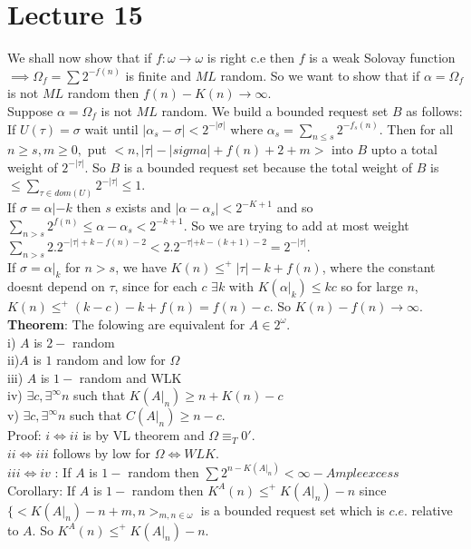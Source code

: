 \documentclass{article}
\begin{document}
      \section{Lecture 15}
      We shall now show that if $f: \omega \to \omega$ is right c.e then $f$ is a weak Solovay function $\implies \Omega_f = \sum 2^{-f(n)}$ is finite and $ML$ random. So we want to show that if $\alpha = \Omega_f $ is not $ML$ random then $f(n) - K(n) \to \infty$. \\
      Suppose $\alpha = \Omega_f$ is not $ML$ random. We build a bounded request set $B$ as follows: If $U(\tau) = \sigma$ wait until $|\alpha_s - \sigma| < 2^{-|\sigma|}$ where $\alpha_s = \sum_{n\leq s} 2^{-f_s(n)}$. Then for all $n\geq s,m\geq 0,$ put $<n,|\tau| - |sigma| + f(n) + 2 +m> $ into $B$ upto a total weight of $2^{-|\tau|}$.  So $B$ is a bounded request set because the total weight of $B$ is $\leq \sum_{\tau \in dom(U)} 2^{-|\tau|} \leq 1$. \\
      If $\sigma = \alpha|-k$ then $s$ exists and $|\alpha - \alpha_s| < 2^{-K+1}$ and so $\sum_{n> s} 2^{f(n) } \leq \alpha - \alpha_s < 2^{-k + 1}$. So we are trying to add at most weight $\sum_{n>s}2.2^{-|\tau| + k -f(n)-2} < 2.2^{-\tau| + k - (k+1) - 2} = 2^{-|\tau|}$.\\
      If $\sigma = \alpha|_k$ for $n>s$, we have $K(n) \leq^+ |\tau| - k + f(n)$, where the constant doesnt depend on $\tau$, since for each $c$ $\exists k$ with $K(\alpha|_k) \leq kc$ so for large $n$, $K(n) \leq^+ (k-c)-k+f(n) = f(n) - c$. So $K(n) -f(n) \to \infty$.
      \\
      \textbf{Theorem}: The folowing are equivalent for $A \in 2^\omega$.\\
      i) $A$ is $2-$ random\\
      ii)$A$ is $1$ random and low for $\Omega$\\
      iii) $A$ is $1-$ random and WLK\\
      iv) $\exists c, \exists^\infty n $ such that $K(A|_n) \geq n + K(n) - c$\\
      v) $\exists c, \exists^\infty n$ such that $C(A|_n) \geq n-c$.\\
      Proof: $i\iff ii$ is by VL theorem and $\Omega\equiv_T 0'$.\\
      $ii \iff iii$ follows by low for $\Omega \iff WLK$.\\
      $iii \iff iv$ : If $A$ is $1-$ random then $\sum 2^{n-K(A|_n)}< \infty - Ample excess$\\
      Corollary: If $A$ is $1-$ random then $K^A(n) \leq^+ K(A|_n) - n$ since $\{<K(A|_n) - n + m , n>_{m,n \in \omega} $ is a bounded request set  which is $c.e.$ relative to $A$. So $K^A(n) \leq^+ K(A|_n) - n$.\\
\end{document}
